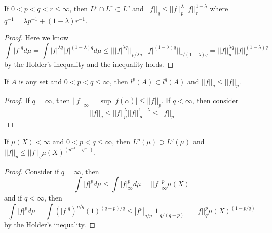 \documentclass[lang=en, color=blue, ]{elegantbook}
\begin{document}
\begin{proposition}
    If $0 < p < q < r \leq \infty$, then $L^p\cap L^r \subset L^q$ and $||f||_q \leq ||f||_p^{\lambda}||f||_r^{1-\lambda}$ where $q^{-1} = \lambda p^{-1}+(1-\lambda)r^{-1}$.
\end{proposition}
\begin{proof}\par
    Here we know
    \[
    \int |f|^q d\mu = \int |f|^{\lambda q}|f|^{(1-\lambda)q} d\mu \leq |||f|^{\lambda q}||_{p/\lambda q}|||f|^{(1-\lambda)q}||_{r/(1-\lambda)q} = ||f||_p^{\lambda q}||f||_r^{(1-\lambda)q}
    \]
    by the Holder's inequality and the inequality holds.\par
\end{proof}

\begin{proposition}
    If $A$ is any set and $0 < p < q \leq \infty$, then $l^p(A) \subset l^q(A)$ and $||f||_q \leq ||f||_p$.    
\end{proposition}
\begin{proof}
    If $q = \infty$, then $||f||_{\infty} = \sup |f(\alpha)| \leq ||f||_p$. If $q < \infty$, then consider
    \[
    ||f||_q \leq ||f||_p^{\lambda}||f||_{\infty}^{1-\lambda} \leq ||f||_p
    \]
\end{proof}

\begin{proposition}
    If $\mu(X)<\infty$ and $0<p<q\leq \infty$, then $L^p(\mu) \supset L^q(\mu)$ and $||f||_p \leq ||f||_q\mu(X)^{(p^{-1}-q^{-1})}$.
\end{proposition}
\begin{proof}\par
    Consider if $q =\infty$, then
    \[
    \int |f|^p d\mu \leq \int |f|_{\infty}^p d\mu = ||f||_{\infty}^p \mu(X)
    \]
    and if $q<\infty$, then
    \[
    \int |f|^p d\mu = \int (|f|^{q})^{p/q}(1)^{(q-p)/q} \leq |f^p|_{q/p}|1|_{q/(q-p)} = ||f||_q^p \mu(X)^{(1-p/q)}
    \]
    by the Holder's inequality.
\end{proof}
\end{document}
